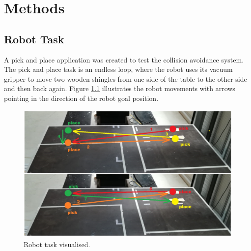 \chapter{Methods}
\label{chap:method}                                   
\section{Robot Task}                                   
\label{sec: usecase}                                   
A pick and place application was created to test the collision avoidance system. The pick and place task is an endless loop, where the robot uses its vacuum gripper to move two wooden shingles from one side of the table to the other side and then back again. Figure \ref{fig:robotask} illustrates the robot movements with arrows pointing in the direction of the robot goal position.
                                                       
\begin{figure}[H]                                      
	\centering\includegraphics[scale=0.38]{images/robot_task.jpeg}		
	\caption{Robot task visualised.}   
	\label{fig:robotask}                    
\end{figure}                                           
